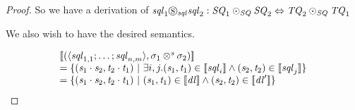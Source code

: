 \documentclass[numbers,10pt,preprint\ifanon ,nocopyrightspace\fi]{sigplanconf}
\begin{document}
\begin{proof}
  So we have a derivation of
  $\mathit{sql}_1\circledS_{\mathit{sql}}\mathit{sql}_2 :
  \mathit{SQ}_1\odot_{\mathit{SQ}}\mathit{SQ}_2 \Leftrightarrow
  \mathit{TQ}_2\odot_{\mathit{SQ}}\mathit{TQ}_1$

  We also wish to have the desired semantics.

  \[
    \begin{array}{l}
      \SemanticsOf{(\DNFLensOf{\SequenceLens_{1,1};\ldots;\SequenceLens_{n,m}},
      \DistributeSwapPermutationOf{\sigma_1}{\sigma_2})}\\
      = \SetOf{(\String_1\Concat\String_2,\StringAlt_2\Concat\StringAlt_1)
      \SuchThat \exists i,j. (\String_1,\StringAlt_1) \in
      \SemanticsOf{\SequenceLens_i} \BooleanAnd (\String_2,\StringAlt_2) \in
      \SemanticsOf{\SequenceLens_j}}\\
      = \SetOf{(\String_1\Concat\String_2,\StringAlt_2\Concat\StringAlt_1)
      \SuchThat (\String_1,\StringAlt_1) \in
      \SemanticsOf{\DNFLens} \BooleanAnd (\String_2,\StringAlt_2) \in
      \SemanticsOf{\DNFLens'}}
    \end{array}
  \]
\end{proof}

\end{document}
